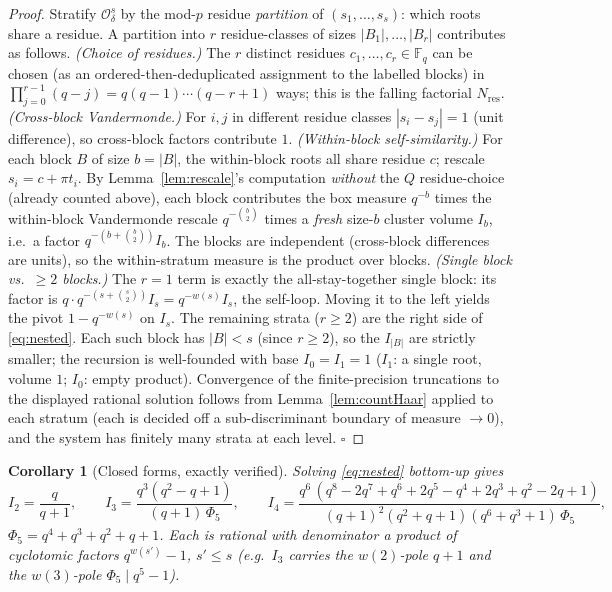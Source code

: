 \documentclass[11pt]{article}
\newtheorem{corollary}[theorem]{Corollary}
\theoremstyle{definition}
\theoremstyle{remark}
\newcommand{\Odelta}{\mathcal{O}_\delta}
\newcommand{\Fq}{\mathbb{F}_q}
\begin{document}
\begin{proof}
Stratify $\Odelta^s$ by the mod-$p$ residue \emph{partition} of $(s_1,\dots,s_s)$:
which roots share a residue. A partition into $r$ residue-classes of sizes
$|B_1|,\dots,|B_r|$ contributes as follows.
\emph{(Choice of residues.)} The $r$ distinct residues $c_1,\dots,c_r\in\Fq$ can be
chosen (as an ordered-then-deduplicated assignment to the labelled blocks) in
$\prod_{j=0}^{r-1}(q-j)=q(q-1)\cdots(q-r+1)$ ways; this is the falling factorial
$N_{\mathrm{res}}$.
\emph{(Cross-block Vandermonde.)} For $i,j$ in different residue classes
$|s_i-s_j|=1$ (unit difference), so cross-block factors contribute $1$.
\emph{(Within-block self-similarity.)} For each block $B$ of size $b=|B|$, the
within-block roots all share residue $c$; rescale $s_i=c+\pi t_i$. By
Lemma~\ref{lem:rescale}'s computation \emph{without} the $Q$ residue-choice (already
counted above), each block contributes the box measure $q^{-b}$ times the
within-block Vandermonde rescale $q^{-\binom b2}$ times a \emph{fresh} size-$b$
cluster volume $I_b$, i.e.\ a factor $q^{-(b+\binom b2)}I_b$. The blocks are
independent (cross-block differences are units), so the within-stratum measure is
the product over blocks.
\emph{(Single block vs.\ $\ge2$ blocks.)} The $r=1$ term is exactly the
all-stay-together single block: its factor is
$q\cdot q^{-(s+\binom s2)}I_s=q^{-w(s)}I_s$, the self-loop. Moving it to the left
yields the pivot $1-q^{-w(s)}$ on $I_s$. The remaining strata ($r\ge2$) are the
right side of \eqref{eq:nested}. Each such block has $|B|<s$ (since $r\ge2$), so the
$I_{|B|}$ are strictly smaller; the recursion is well-founded with base
$I_0=I_1=1$ ($I_1$: a single root, volume $1$; $I_0$: empty product). Convergence of
the finite-precision truncations to the displayed rational solution follows from
Lemma~\ref{lem:countHaar} applied to each stratum (each is decided off a
sub-discriminant boundary of measure $\to0$), and the system has finitely many
strata at each level. $\square$
\end{proof}

\begin{corollary}[Closed forms, exactly verified]\label{cor:closed}
Solving \eqref{eq:nested} bottom-up gives
\[
  I_2=\frac{q}{q+1},\qquad
  I_3=\frac{q^3(q^2-q+1)}{(q+1)\,\Phi_5},\qquad
  I_4=\frac{q^6\,(q^8-2q^7+q^6+2q^5-q^4+2q^3+q^2-2q+1)}
          {(q+1)^2(q^2+q+1)(q^6+q^3+1)\,\Phi_5},
\]
$\Phi_5=q^4+q^3+q^2+q+1$. Each is rational with denominator a product of cyclotomic
factors $q^{w(s')}-1$, $s'\le s$ (e.g.\ $I_3$ carries the $w(2)$-pole $q+1$ and the
$w(3)$-pole $\Phi_5\mid q^5-1$).
\end{corollary}
\end{document}
